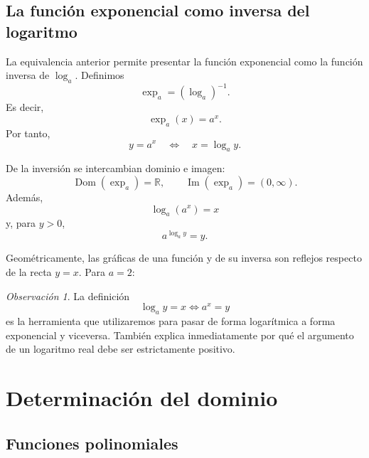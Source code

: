 \documentclass[12pt]{article}
\theoremstyle{remark}
\newtheorem{observacion}{Observación}[section]
\newcommand{\R}{\mathbb{R}}
\newcommand{\Dom}{\operatorname{Dom}}
\newcommand{\Ima}{\operatorname{Im}}
\begin{document}
\subsection{La función exponencial como inversa del logaritmo}

La equivalencia anterior permite presentar la función exponencial como la
función inversa de $\log_a$. Definimos
\[
\boxed{\exp_a=(\log_a)^{-1}}.
\]
Es decir,
\[
\boxed{\exp_a(x)=a^x}.
\]
Por tanto,
\[
\boxed{y=a^x\quad\Longleftrightarrow\quad x=\log_a y}.
\]

De la inversión se intercambian dominio e imagen:
\[
\Dom(\exp_a)=\R,
\qquad
\Ima(\exp_a)=(0,\infty).
\]
Además,
\[
\log_a(a^x)=x
\]
y, para $y>0$,
\[
a^{\log_a y}=y.
\]

Geométricamente, las gráficas de una función y de su inversa son reflejos
respecto de la recta $y=x$. Para $a=2$:

\begin{center}
\end{center}

\begin{observacion}
La definición
\[
\log_a y=x\Longleftrightarrow a^x=y
\]
es la herramienta que utilizaremos para pasar de forma logarítmica a forma
exponencial y viceversa. También explica inmediatamente por qué el argumento
de un logaritmo real debe ser estrictamente positivo.
\end{observacion}

\section{Determinación del dominio}

\subsection{Funciones polinomiales}
\end{document}
